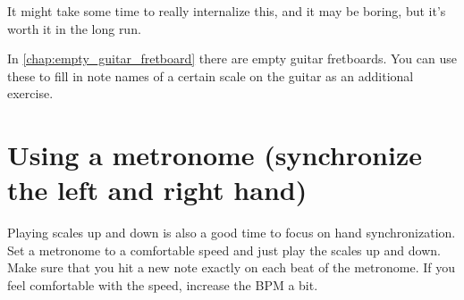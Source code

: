It might take some time to really internalize this, and it may be boring, but it's worth it in the long run.

In \autoref{chap:empty_guitar_fretboard} there are empty guitar fretboards. You can use these to fill in note names of a certain scale on the guitar as an additional exercise.

\section{Using a metronome (synchronize the left and right hand)}

Playing scales up and down is also a good time to focus on hand synchronization. Set a metronome to a comfortable speed and just play the scales up and down. Make sure that you hit a new note exactly on each beat of the metronome. If you feel comfortable with the speed, increase the BPM a bit.

